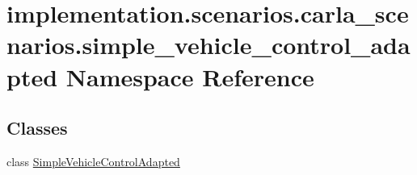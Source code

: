 \hypertarget{namespaceimplementation_1_1scenarios_1_1carla__scenarios_1_1simple__vehicle__control__adapted}{}\section{implementation.\+scenarios.\+carla\+\_\+scenarios.\+simple\+\_\+vehicle\+\_\+control\+\_\+adapted Namespace Reference}
\label{namespaceimplementation_1_1scenarios_1_1carla__scenarios_1_1simple__vehicle__control__adapted}
\subsection*{Classes}
\begin{DoxyCompactItemize}
\item 
class \hyperlink{classimplementation_1_1scenarios_1_1carla__scenarios_1_1simple__vehicle__control__adapted_1_1_simple_vehicle_control_adapted}{Simple\+Vehicle\+Control\+Adapted}
\end{DoxyCompactItemize}
